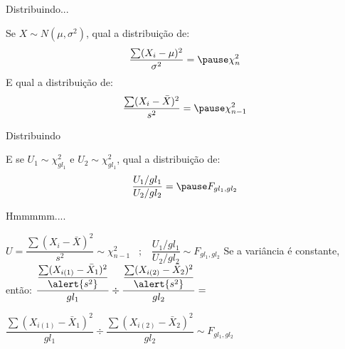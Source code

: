 \documentclass{beamer}\usepackage[]{graphicx}\usepackage[]{color}
\begin{document}
\begin{frame}{Distribuindo...}

Se $X \sim N(\mu,\sigma^2)$, qual a distribuição de:
\vfill
\begin{equation*}
\frac{\sum(X_i - \mu)^2}{\sigma^2} = \pause \chi ^2 _n
\end{equation*} \pause
\vfill
E qual a distribuição de: 
\begin{equation*}
\frac{\sum(X_i - \bar X)^2}{s^2} = \pause \chi ^2 _{n-1}
\end{equation*} 

\end{frame}


\begin{frame}{Distribuindo}

E se $U_1 \sim \chi ^2 _{gl_1}$ e $U_2 \sim \chi ^2 _{gl_1}$, qual a distribuição de:
\vfill
\begin{equation*}
\frac{U_1/gl_1}{U_2/gl_2} = \pause F _{gl_1,gl_2}
\end{equation*}

\end{frame}


\begin{frame}{Hmmmmm....}


$U = \dfrac{\sum(X_i - \bar X)^2}{s^2} \sim \chi ^2 _{n-1} \mspace{15mu} ; \mspace{15mu} \dfrac{U_1/gl_1}{U_2/gl_2} \sim F _{gl_1,gl_2}$  \pause
\vfill
Se a variância é constante, então: \pause
\vfill
$  \dfrac{\dfrac{\sum(X_{i(1)} - \bar X_1)^2}{\alert{s^2}}}{gl_1} \div \dfrac{\dfrac{\sum(X_{i(2)} - \bar X_2)^2}{\alert{s^2}}}{gl_2} =$  \pause 

\vfill
$\dfrac{\sum(X_{i(1)} - \bar X_1)^2}{gl_1} \div \dfrac{\sum(X_{i(2)} - \bar X_2)^2}{gl_2} \sim F _{gl_1,gl_2}$

\end{frame}
\end{document}
